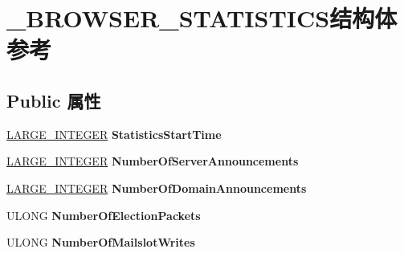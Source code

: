 \hypertarget{struct___b_r_o_w_s_e_r___s_t_a_t_i_s_t_i_c_s}{}\section{\+\_\+\+B\+R\+O\+W\+S\+E\+R\+\_\+\+S\+T\+A\+T\+I\+S\+T\+I\+C\+S结构体 参考}
\label{struct___b_r_o_w_s_e_r___s_t_a_t_i_s_t_i_c_s}
\subsection*{Public 属性}
\begin{DoxyCompactItemize}
\item 
\mbox{\label{struct___b_r_o_w_s_e_r___s_t_a_t_i_s_t_i_c_s_abed323c1973662bc5a233bb136a04863}} 
\hyperlink{union___l_a_r_g_e___i_n_t_e_g_e_r}{L\+A\+R\+G\+E\+\_\+\+I\+N\+T\+E\+G\+ER} {\bfseries Statistics\+Start\+Time}
\item 
\mbox{\label{struct___b_r_o_w_s_e_r___s_t_a_t_i_s_t_i_c_s_acfd0a8237b0de451fabd2d1b0515290a}} 
\hyperlink{union___l_a_r_g_e___i_n_t_e_g_e_r}{L\+A\+R\+G\+E\+\_\+\+I\+N\+T\+E\+G\+ER} {\bfseries Number\+Of\+Server\+Announcements}
\item 
\mbox{\label{struct___b_r_o_w_s_e_r___s_t_a_t_i_s_t_i_c_s_aafefc84f5934c6110cc9f1163f5e9cf8}} 
\hyperlink{union___l_a_r_g_e___i_n_t_e_g_e_r}{L\+A\+R\+G\+E\+\_\+\+I\+N\+T\+E\+G\+ER} {\bfseries Number\+Of\+Domain\+Announcements}
\item 
\mbox{\label{struct___b_r_o_w_s_e_r___s_t_a_t_i_s_t_i_c_s_a3b65e62c8debbe16d13df6dc1f69b01c}} 
U\+L\+O\+NG {\bfseries Number\+Of\+Election\+Packets}
\item 
\mbox{\label{struct___b_r_o_w_s_e_r___s_t_a_t_i_s_t_i_c_s_a8e5bade1ee9762af63eeb3b6b7138cea}} 
U\+L\+O\+NG {\bfseries Number\+Of\+Mailslot\+Writes}
\item 
\mbox{\label{struct___b_r_o_w_s_e_r___s_t_a_t_i_s_t_i_c_s_ac420ac3ae2108628a001506b4d0e6f37}} 

\end{DoxyCompactItemize}
